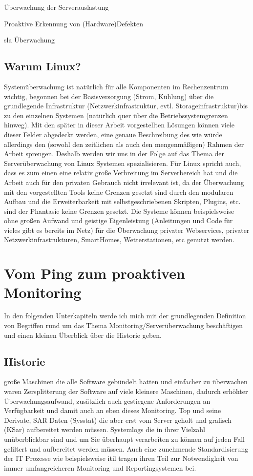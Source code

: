 \documentclass[12pt,a4paper,parskip]{scrreprt}
\begin{document}
		Überwachung der Serverauslastung
		
		Proaktive Erkennung von (Hardware)Defekten
		
		\gls{sla} Überwachung
	\section{Warum Linux?}
	Systemüberwachung ist natürlich für alle Komponenten im Rechenzentrum wichtig, begonnen bei der Basisversorgung (Strom, Kühlung) über die grundlegende Infrastruktur (Netzwerkinfrastruktur, evtl. Storageinfrastruktur)bis zu den einzelnen Systemen (natürlich quer über die Betriebssystemgrenzen hinweg). Mit den später in dieser Arbeit vorgestellten Lösungen können viele dieser Felder abgedeckt werden, eine genaue Beschreibung des wie würde allerdings den (sowohl den zeitlichen als auch den mengenmäßigen) Rahmen der Arbeit sprengen. Deshalb werden wir uns in der Folge auf das Thema der Serverüberwachung von Linux Systemen spezialisieren. Für Linux spricht auch, dass es zum einen eine relativ große Verbreitung im Serverbereich hat und die Arbeit auch für den privaten Gebrauch nicht irrelevant ist, da der Überwachung mit den vorgestellten Tools keine Grenzen gesetzt sind durch den modularen Aufbau und die Erweiterbarkeit mit selbstgeschriebenen Skripten, Plugins, \acrshort{etc}. sind der Phantasie keine Grenzen gesetzt. Die Systeme können beispielsweise ohne großen Aufwand und geistige Eigenleistung (Anleitungen und Code für vieles gibt es bereits im Netz) für die Überwachung privater Webservices, privater Netzwerkinfrastrukturen, SmartHomes, Wetterstationen, \acrshort{etc} genutzt werden.
		
	
	\chapter{Vom Ping zum proaktiven Monitoring}
	In den folgenden Unterkapiteln werde ich mich mit der grundlegenden Definition von Begriffen rund um das Thema Monitoring/Serverüberwachung beschäftigen und einen kleinen Überblick über die Historie geben.
	\section{Historie}
	große Maschinen die alle Software gebündelt hatten und einfacher zu überwachen waren
	Zersplitterung der Software auf viele kleinere Maschinen, dadurch erhöhter Überwachungsaufwand, zusätzlich auch gestiegene Anforderungen an Verfügbarkeit und damit auch an eben dieses Monitoring.
	Top und seine Derivate, SAR Daten (Sysstat) die aber erst vom Server geholt und grafisch (KSar) aufbereitet werden müssen. Systemlogs die in ihrer Vielzahl unüberblickbar sind und um Sie überhaupt verarbeiten zu können auf jeden Fall gefiltert und aufbereitet werden müssen. Auch eine zunehmende Standardisierung der IT Prozesse wie beispielsweise \acrfull{itil} tragen ihren Teil zur Notwendigkeit von immer umfangreicheren Monitoring und Reportingsystemen bei.
\end{document}
